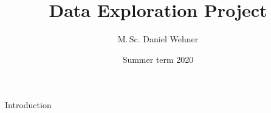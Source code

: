 \documentclass{beamer}
\title{Data Exploration Project}
\author{M.\,Sc. Daniel Wehner}
\date{Summer term 2020}
\begin{document}
\maketitle
\frame{\tableofcontents[currentsection]}

\begin{frame}{Introduction}{}

\end{frame}
\end{document}
